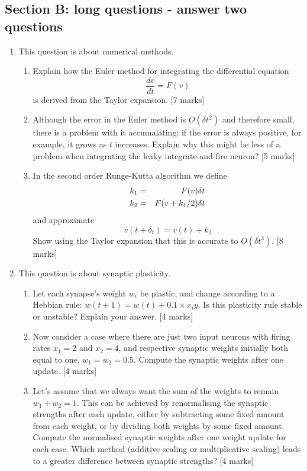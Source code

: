\documentclass[a4paper,12pt]{article}
\newif\ifsoln
\begin{document}
\subsection*{Section B: long questions - answer two questions}

\begin{enumerate}


\item This question is about numerical methods. 
\begin{enumerate}
\item Explain how the Euler method for integrating the differential equation 
$$\frac{dv}{dt}=F(v)$$
is derived from the Taylor expansion. [7 marks]
\item Although the error in the Euler method is $O(\delta t^2)$ and
  therefore small, there is a problem with it accumalating: if the
  error is always positive, for example, it grows as $t$
  increases. Explain why this might be less of a problem when
  integrating the leaky integrate-and-fire neuron? [5 marks]
\item In the second order Runge-Kutta algorithm we define
\begin{eqnarray*}
k_1&=&F(v)\delta t\cr
k_2&=&F(v+k_1/2)\delta t
\end{eqnarray*}
and approximate
$$
v(t+\delta_t)=v(t)+k_2
$$
Show using the Taylor expansion that this is accurate to $O(\delta t^3)$. [8 marks]
\end{enumerate}

\ifsoln Solution:  a) and c) see notes; b) because of the reset. \fi

 
\item This question is about synaptic plasticity.
\begin{enumerate}
\item Let each synapse's weight $w_i$ be plastic, and change according
  to a Hebbian rule: $w(t+1) = w(t) + 0.1 \times x_i y$. Is this
  plasticity rule stable or unstable? Explain your answer. [4 marks]
 
\item Now consider a case where there are just two input neurons with
  firing rates $x_1 = 2$ and $x_2 = 4$, and respective synaptic
  weights initially both equal to one, $w_1 = w_2 = 0.5$. Compute the
  synaptic weights after one update. [4 marks]
 
\item Let's assume that we always want the sum of the weights to remain $w_1 + w_2 = 1$. This can be achieved by renormalising the synaptic strengths after each update, either by subtracting some fixed amount from each weight, or by dividing both weights by some fixed amount. Compute the normalised synaptic weights after one weight update for each case. Which method (additive scaling or multiplicative scaling) leads to a greater difference between synaptic strengths? [4 marks]
 

\end{enumerate}
\end{enumerate}
\end{document}
